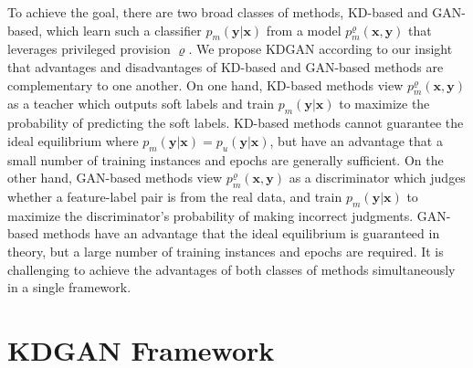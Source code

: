 \documentclass{article}
\newcommand{\OVEC}[1]{\bm{#1}} %
\newcommand{\pclf}{p_{m}(\OVEC{y}|\OVEC{x})}
\newcommand{\ppri}{p_{m}^{\varrho}(\OVEC{x},\OVEC{y})}
\newcommand{\fullpdat}{p_{u}(\OVEC{y}|\OVEC{x})}
\begin{document}
To achieve the goal, there are two broad classes of methods, KD-based and GAN-based, which learn such a classifier $\pclf$ from a model $\ppri$ that leverages privileged provision $\varrho$.
We propose KDGAN according to our insight that advantages and disadvantages of KD-based and GAN-based methods are complementary to one another.
On one hand, KD-based methods \cite{ba2014deep} view $\ppri$ as a teacher which outputs soft labels and train $\pclf$ to maximize the probability of predicting the soft labels.
KD-based methods cannot guarantee the ideal equilibrium where $\pclf=\fullpdat$, but have an advantage that a small number of training instances and epochs are generally sufficient.
On the other hand, GAN-based methods \cite{wang2017irgan} view $\ppri$ as a discriminator which judges whether a feature-label pair is from the real data, and train $\pclf$ to maximize the discriminator's probability of making incorrect judgments.
GAN-based methods have an advantage that the ideal equilibrium is guaranteed in theory, but a large number of training instances and epochs are required.
It is challenging to achieve the advantages of both classes of methods simultaneously in a single framework.


\section{KDGAN Framework}
\end{document}
